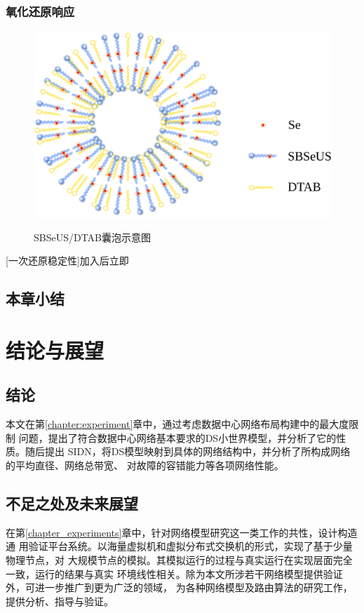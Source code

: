 \documentclass[bachelor,fandolfonts,replaceperiod]{jnuthesis}
\begin{document}
    \subsection{氧化还原响应}
    
    \begin{figure}[htbp]
        \centering
        \includegraphics[width=0.46\linewidth]{figure/vesicle-scheme.pdf}\\
        \caption{SBSeUS/DTAB囊泡示意图}\label{fig:vesicle-concentration-line}
    \end{figure}
    [一次还原稳定性]加入后立即
    \section{本章小结}

    \chapter{结论与展望}\label{chapter:concludes}
    \section{结论}
    本文在第\ref{chapter:experiment}章中，通过考虑数据中心网络布局构建中的最大度限制
    问题，提出了符合数据中心网络基本要求的DS小世界模型，并分析了它的性质。随后提出
    SIDN，将DS模型映射到具体的网络结构中，并分析了所构成网络的平均直径、网络总带宽、
    对故障的容错能力等各项网络性能。
    
    \zhlipsum[1-3]
    
    \section{不足之处及未来展望}
    在第\ref{chapter_experiments}章中，针对网络模型研究这一类工作的共性，设计构造通
    用验证平台系统。以海量虚拟机和虚拟分布式交换机的形式，实现了基于少量物理节点，对
    大规模节点的模拟。其模拟运行的过程与真实运行在实现层面完全一致，运行的结果与真实
    环境线性相关。除为本文所涉若干网络模型提供验证外，可进一步推广到更为广泛的领域，
    为各种网络模型及路由算法的研究工作，提供分析、指导与验证。
    
\end{document}
